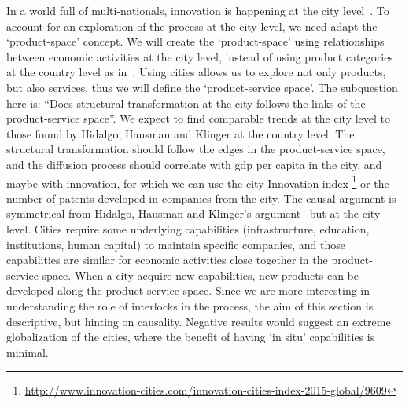 In a world full of multi-nationals, innovation is happening at the city level~\citep{Belderbos2014}.
To account for an exploration of the process at the city-level, we need adapt the `product-space' concept. 
We will create the `product-space' using relationships between economic activities at the city level,
instead of using product categories at the country level as in~\cite{hidalgo2007, hausmann2011, Hausmann2006,hidalgo2009}.
Using cities allows us to explore not only products, but also services, thus we will define the `product-service space'. 
The subquestion here is: ``Does structural transformation at the city follows the links of the product-service space''.
We expect to find comparable trends at the city level to those found by Hidalgo, Hausman and Klinger at the country level.
The structural transformation should follow the edges in the product-service space, 
and the diffusion process should correlate with gdp per capita in the city, 
and maybe with innovation, for which we can use the city Innovation index \footnote{\url{http://www.innovation-cities.com/innovation-cities-index-2015-global/9609}}
or the number of patents developed in companies from the city.
The causal argument is symmetrical from Hidalgo, Hausman and Klinger's argument~\cite{hidalgo2007, hausmann2011, Hausmann2006,hidalgo2009} but at the city level.
Cities require some underlying capabilities (infrastructure, education, institutions, human capital) to maintain specific companies,
and those capabilities are similar for economic activities close together in the product-service space.
When a city acquire new capabilities, new products can be developed along the product-service space.
Since we are more interesting in understanding the role of interlocks in the process, 
the aim of this section is descriptive, 
but hinting on causality.
Negative results would suggest an extreme globalization of the cities, 
where the benefit of having `in situ' capabilities is minimal.




